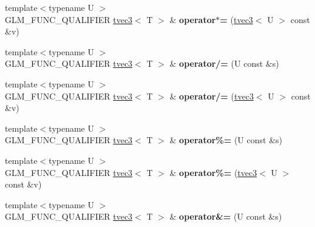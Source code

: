 \begin{DoxyCompactItemize}
\item 
\hypertarget{structglm_1_1detail_1_1tvec3_a6e67f23dc13d11ef371d48258fe22fd5}{}{\footnotesize template$<$typename U $>$ }\\G\+L\+M\+\_\+\+F\+U\+N\+C\+\_\+\+Q\+U\+A\+L\+I\+F\+I\+E\+R \hyperlink{structglm_1_1detail_1_1tvec3}{tvec3}$<$ T $>$ \& {\bfseries operator$\ast$=} (\hyperlink{structglm_1_1detail_1_1tvec3}{tvec3}$<$ U $>$ const \&v)\label{structglm_1_1detail_1_1tvec3_a6e67f23dc13d11ef371d48258fe22fd5}

\item 
\hypertarget{structglm_1_1detail_1_1tvec3_aaf43e2e7550db50a73daac9f19ab3da0}{}{\footnotesize template$<$typename U $>$ }\\G\+L\+M\+\_\+\+F\+U\+N\+C\+\_\+\+Q\+U\+A\+L\+I\+F\+I\+E\+R \hyperlink{structglm_1_1detail_1_1tvec3}{tvec3}$<$ T $>$ \& {\bfseries operator/=} (U const \&s)\label{structglm_1_1detail_1_1tvec3_aaf43e2e7550db50a73daac9f19ab3da0}

\item 
\hypertarget{structglm_1_1detail_1_1tvec3_accea3bc20f85349592f24c745e92af4e}{}{\footnotesize template$<$typename U $>$ }\\G\+L\+M\+\_\+\+F\+U\+N\+C\+\_\+\+Q\+U\+A\+L\+I\+F\+I\+E\+R \hyperlink{structglm_1_1detail_1_1tvec3}{tvec3}$<$ T $>$ \& {\bfseries operator/=} (\hyperlink{structglm_1_1detail_1_1tvec3}{tvec3}$<$ U $>$ const \&v)\label{structglm_1_1detail_1_1tvec3_accea3bc20f85349592f24c745e92af4e}

\item 
\hypertarget{structglm_1_1detail_1_1tvec3_a3e04059f4cf2bb09d913c72f7f16999d}{}{\footnotesize template$<$typename U $>$ }\\G\+L\+M\+\_\+\+F\+U\+N\+C\+\_\+\+Q\+U\+A\+L\+I\+F\+I\+E\+R \hyperlink{structglm_1_1detail_1_1tvec3}{tvec3}$<$ T $>$ \& {\bfseries operator\%=} (U const \&s)\label{structglm_1_1detail_1_1tvec3_a3e04059f4cf2bb09d913c72f7f16999d}

\item 
\hypertarget{structglm_1_1detail_1_1tvec3_a9ee07143166b23d7f418c5f52b5f02ae}{}{\footnotesize template$<$typename U $>$ }\\G\+L\+M\+\_\+\+F\+U\+N\+C\+\_\+\+Q\+U\+A\+L\+I\+F\+I\+E\+R \hyperlink{structglm_1_1detail_1_1tvec3}{tvec3}$<$ T $>$ \& {\bfseries operator\%=} (\hyperlink{structglm_1_1detail_1_1tvec3}{tvec3}$<$ U $>$ const \&v)\label{structglm_1_1detail_1_1tvec3_a9ee07143166b23d7f418c5f52b5f02ae}

\item 
\hypertarget{structglm_1_1detail_1_1tvec3_a935bec1a7a9d68544b77d0027605298c}{}{\footnotesize template$<$typename U $>$ }\\G\+L\+M\+\_\+\+F\+U\+N\+C\+\_\+\+Q\+U\+A\+L\+I\+F\+I\+E\+R \hyperlink{structglm_1_1detail_1_1tvec3}{tvec3}$<$ T $>$ \& {\bfseries operator\&=} (U const \&s)\label{structglm_1_1detail_1_1tvec3_a935bec1a7a9d68544b77d0027605298c}


\end{DoxyCompactItemize}
